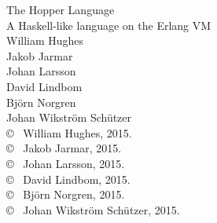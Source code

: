 %	
%	


\newpage
\thispagestyle{plain}
\vspace*{4.5cm}
The Hopper Language\\
A Haskell-like language on the Erlang VM\\
William Hughes \\
Jakob Jarmar   \\
Johan Larsson \\
David Lindbom \\
Björn Norgren \\
Johan Wikström Schützer \\[0.5cm]

\copyright ~ William Hughes, 2015.\\
\copyright ~ Jakob Jarmar, 2015.\\
\copyright ~ Johan Larsson, 2015.\\
\copyright ~ David Lindbom, 2015.\\
\copyright ~ Björn Norgren, 2015.\\
\copyright ~ Johan Wikström Schützer, 2015.\\[0.5cm]

